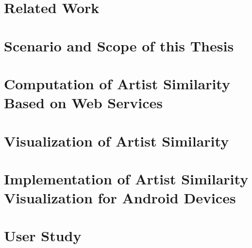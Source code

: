 \documentclass[a4paper,11pt,twoside]{memoir}
\begin{document}


\chapter{Related Work}
\label{ch:relatedwork}



\chapter{Scenario and Scope of this Thesis}
\label{ch:scenario}



\chapter{Computation of Artist Similarity Based on Web Services}
\label{ch:computation}



\chapter{Visualization of Artist Similarity}
\label{ch:visualization}



\chapter{Implementation of Artist Similarity Visualization for Android Devices}
\label{ch:implementation}



\chapter{User Study}
\label{ch:userstudy}


\end{document}
